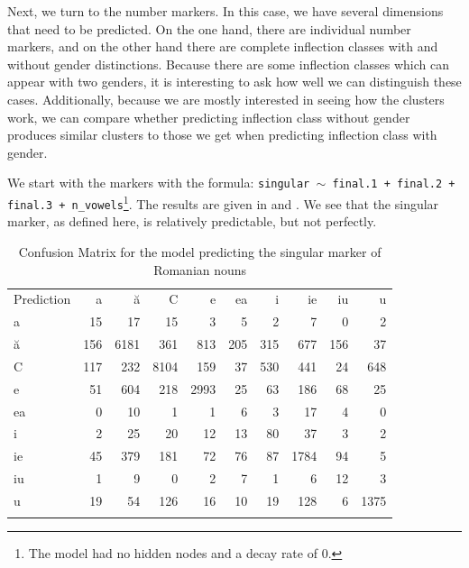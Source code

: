 Next, we turn to the number markers. In this case, we have several dimensions that need to be predicted. On the one hand, there are individual number markers, and on the other hand there are complete inflection classes with and without gender distinctions. Because there are some inflection classes which can appear with two genders, it is interesting to ask how well we can distinguish these cases.  Additionally, because we are mostly interested in seeing how the clusters work, we can compare whether predicting inflection class without gender produces similar clusters to those we get when predicting inflection class with gender.

We start with the  markers with the formula: \texttt{singular $\sim$ final.1 + final.2 + final.3 + n\_vowels}\footnote{The model had no hidden nodes and a decay rate of 0.}. The results are given in  and . We see that the singular marker, as defined here, is relatively predictable, but not perfectly.

\begin{table}
  \centering
  \begin{tabular}{lrrrrrrrrr}
    \lsptoprule
    \multicolumn{10}{c}{Reference}                                         \\
    \midrule
    Prediction & a   & ă    & C    & e    & ea  & i   & ie   & iu  & u    \\
    a          & 15  & 17   & 15   & 3    & 5   & 2   & 7    & 0   & 2    \\
    ă          & 156 & 6181 & 361  & 813  & 205 & 315 & 677  & 156 & 37   \\
    C          & 117 & 232  & 8104 & 159  & 37  & 530 & 441  & 24  & 648  \\
    e          & 51  & 604  & 218  & 2993 & 25  & 63  & 186  & 68  & 25   \\
    ea         & 0   & 10   & 1    & 1    & 6   & 3   & 17   & 4   & 0    \\
    i          & 2   & 25   & 20   & 12   & 13  & 80  & 37   & 3   & 2    \\
    ie         & 45  & 379  & 181  & 72   & 76  & 87  & 1784 & 94  & 5    \\
    iu         & 1   & 9    & 0    & 2    & 7   & 1   & 6    & 12  & 3    \\
    u          & 19  & 54   & 126  & 16   & 10  & 19  & 128  & 6   & 1375 \\
    \lspbottomrule
  \end{tabular}
  \caption{Confusion Matrix for the model predicting the singular marker of Romanian nouns}\label{tab:singular-romanian}
\end{table}

